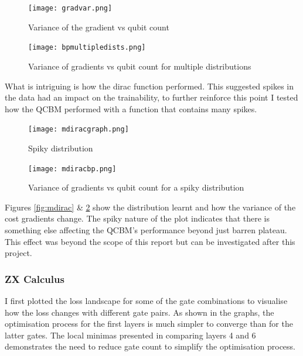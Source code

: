 \documentclass[12pt]{article}
\numberwithin{equation}{section}
\begin{document}
\begin{figure}[h!]
    \centering
    \begin{minipage}{0.48\textwidth}
        \centering
        \texttt{[image: gradvar.png]}
        \caption{Variance of the gradient vs qubit count}
        \label{fig:gradvar}
    \end{minipage}
    \hfill
    \begin{minipage}{0.48\textwidth}
        \centering
        \texttt{[image: bpmultipledists.png]}
        \caption{Variance of gradients vs qubit count for multiple distributions}
        \label{fig:bpmultiple}
    \end{minipage}
\end{figure}
What is intriguing is how the dirac function performed. This suggested spikes in 
the data had an impact on the trainability, to further reinforce this point I 
tested how the QCBM performed with a function that contains many spikes. 
\begin{figure}[h!]
    \centering
    \begin{minipage}{0.48\textwidth}
        \centering
        \texttt{[image: mdiracgraph.png]}
        \caption{Spiky distribution}
        \label{fig:mdirac}
    \end{minipage}
    \hfill
    \begin{minipage}{0.48\textwidth}
        \centering
        \texttt{[image: mdiracbp.png]}
        \caption{Variance of gradients vs qubit count for a spiky distribution}
        \label{fig:bpdirac}
    \end{minipage}
\end{figure}
Figures \ref{fig:mdirac} \& \ref{fig:bpdirac} show the distribution learnt and 
how the variance of the cost gradients change. The spiky nature of the plot 
indicates that there is something else affecting the QCBM's performance beyond 
just barren plateau. This effect was beyond the scope of this report but can be 
investigated after this project. 
\subsubsection{ZX Calculus}

I first plotted the loss landscape for some of the gate combinations to visualise 
how the loss changes with different gate pairs. As shown in the graphs, the 
optimisation process for the first layers is much simpler to converge than for 
the latter gates. The local minimas presented in comparing layers 4 and 6 
demonstrates the need to reduce gate count to simplify the optimisation process. 
\end{document}
